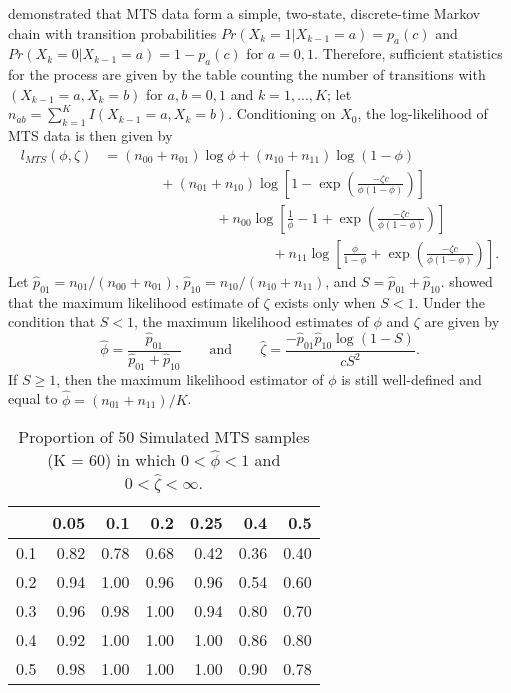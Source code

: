\documentclass[man, noextraspace, floatsintext]{apa6}\usepackage[]{graphicx}\usepackage[]{color}
\begin{document}
\citet{Brown1977estimation} demonstrated that MTS data form a simple, two-state, discrete-time Markov chain with transition probabilities $Pr(X_k = 1 | X_{k-1} = a) = p_a(c)$ and $Pr(X_k = 0 | X_{k-1} = a) = 1 - p_a(c)$ for $a = 0,1$. Therefore, sufficient statistics for the process are given by the table counting the number of transitions with $(X_{k-1} = a, X_k = b)$ for $a,b = 0,1$ and $k = 1,...,K$; let $n_{ab} = \sum_{k=1}^K I(X_{k-1} = a, X_k = b)$. Conditioning on $X_0$, the log-likelihood of MTS data is then given by \begin{equation}
\begin{aligned}
\label{eq:MTS_loglik}
l_{MTS}(\phi, \zeta) &= \left(n_{00} + n_{01}\right) \log \phi + \left(n_{10} + n_{11}\right) \log\left(1 - \phi\right) \\
& \qquad \qquad + \left(n_{01} + n_{10}\right) \log \left[1 - \exp\left(\frac{-\zeta c}{\phi (1 - \phi)}\right)\right] \\
& \qquad \qquad \qquad \qquad + n_{00} \log\left[\frac{1}{\phi} - 1 + \exp\left(\frac{-\zeta c}{\phi (1 - \phi)}\right)\right]\\
& \qquad \qquad \qquad \qquad \qquad \qquad + n_{11}\log\left[\frac{\phi}{1 - \phi} + \exp\left(\frac{-\zeta c}{\phi (1 - \phi)}\right)\right].
\end{aligned}
\end{equation}
Let $\hat{p}_{01} = n_{01}/ \left(n_{00} + n_{01}\right)$, $\hat{p}_{10} = n_{10} / \left(n_{10} + n_{11}\right)$, and $S = \hat{p}_{01} + \hat{p}_{10}$. \citet{Brown1977estimation} showed that the maximum likelihood estimate of $\zeta$ exists only when $S < 1$. Under the condition that $S < 1$, the maximum likelihood estimates of $\phi$ and $\zeta$ are given by 
\begin{equation}
\label{eq:MTS_mle}
\hat\phi = \frac{\hat{p}_{01}}{\hat{p}_{01} + \hat{p}_{10}} \qquad \text{and} \qquad
\hat\zeta = \frac{-\hat{p}_{01} \hat{p}_{10} \log(1 - S)}{c S^2}.
\end{equation}
If $S \geq 1$, then the maximum likelihood estimator of $\phi$ is still well-defined and equal to $\hat\phi = \left(n_{01} + n_{11}\right) / K$. 

\begin{table}[ht]
\centering
\begin{tabular}{rrrrrrr}
  \hline
 & 0.05 & 0.1 & 0.2 & 0.25 & 0.4 & 0.5 \\ 
  \hline
0.1 & 0.82 & 0.78 & 0.68 & 0.42 & 0.36 & 0.40 \\ 
  0.2 & 0.94 & 1.00 & 0.96 & 0.96 & 0.54 & 0.60 \\ 
  0.3 & 0.96 & 0.98 & 1.00 & 0.94 & 0.80 & 0.70 \\ 
  0.4 & 0.92 & 1.00 & 1.00 & 1.00 & 0.86 & 0.80 \\ 
  0.5 & 0.98 & 1.00 & 1.00 & 1.00 & 0.90 & 0.78 \\ 
   \hline
\end{tabular}
\caption{Proportion of 50 Simulated MTS samples (K = 60) in which $0 < \hat\phi < 1$ and $0 < \hat\zeta < \infty$.} 
\label{tab:MTS_zeta_valid}
\end{table}
\end{document}
